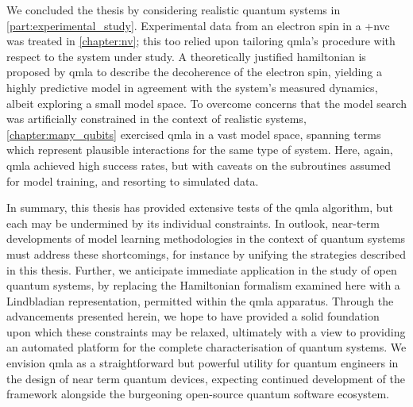 We concluded the thesis by considering realistic quantum systems in \cref{part:experimental_study}. 
Experimental data from an electron spin in a \glsxtrlong+{nvc} was treated in \cref{chapter:nv};
this too relied upon tailoring \gls{qmla}'s procedure with respect to the system under study.
A theoretically justified \gls{hamiltonian} is proposed by \gls{qmla} to describe the decoherence of the electron spin, 
yielding a highly predictive model in agreement with the system's measured dynamics, 
albeit exploring a small model space. 
To overcome concerns that the model search was artificially constrained in the context of realistic systems, 
\cref{chapter:many_qubits} exercised \gls{qmla} in a vast model space, 
spanning terms which represent plausible interactions for the same type of system. 
Here, again, \gls{qmla} achieved high success rates, but with caveats on the subroutines assumed for model training, 
and resorting to simulated data. 
\par

In summary, this thesis has provided extensive tests of the \gls{qmla} algorithm, 
but each may be undermined by its individual constraints. 
In outlook, near-term developments of model learning methodologies in the context of quantum systems
must address these shortcomings, for instance by unifying the strategies described in this thesis. 
Further, we anticipate immediate application in the study of open quantum systems, 
by replacing the Hamiltonian formalism examined here with a Lindbladian representation, 
permitted within the \gls{qmla} apparatus.    
Through the advancements presented herein, we hope to have provided a solid foundation upon which these constraints may be relaxed, 
ultimately with a view to providing an automated platform for the complete characterisation of quantum systems.
We envision \gls{qmla} as a straightforward but powerful utility for quantum engineers in the design of near term quantum devices, 
expecting continued development of the framework alongside the burgeoning open-source quantum software ecosystem. 
\par


